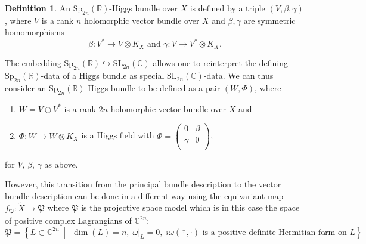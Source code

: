 \documentclass[oneside,11pt]{amsart}
\theoremstyle{definition}
\newtheorem{defn}[thm]{Definition}
\theoremstyle{remark}
\newcommand{\midwd}{\,\middle\vert\,}
\numberwithin{thm}{section}
\numberwithin{equation}{section}
\begin{document}
\begin{defn}\label{defn:classical_Sp2nR}
An $\mathrm{Sp}_{2n}( \mathbb{R})$-Higgs bundle over $X$ is defined by a triple $\left( V,\beta ,\gamma  \right)$, where $V$ is a rank $n$ holomorphic vector bundle over $X$ and $\beta , \gamma$ are symmetric homomorphisms
	\[\beta :{{V}^{*}}\to V\otimes K_X\text{  and  }\gamma :V\to {{V}^{*}}\otimes K_X.\]
\end{defn}

The embedding $\mathrm{Sp}_{2n}( \mathbb{R})\hookrightarrow \mathrm{SL}_{2n}( \mathbb{C})$ allows one to reinterpret the defining $\mathrm{Sp}_{2n}( \mathbb{R})$-data of a Higgs bundle as special $\mathrm{SL}_{2n}( \mathbb{C})$-data. We can thus consider an $\mathrm{Sp}_{2n}( \mathbb{R})$-Higgs bundle to be defined as a pair $\left( W,\Phi  \right)$, where \begin{enumerate}
\item $W=V\oplus {{V}^{*}}$ is a rank $2n$ holomorphic vector bundle over $X$ and
\item $\Phi :W\to W\otimes K_X$ is a Higgs field with $\Phi = \begin{pmatrix}
   0 & \beta   \\
   \gamma  & 0  \\
\end{pmatrix}$, 
\end{enumerate}
for $V$, $\beta$, $\gamma$ as above.

However, this transition from the principal bundle description to the vector bundle description can be done in a different way using the equivariant map $f_\mathfrak P\colon\tilde X\to \mathfrak P$ where $\mathfrak P$ is the projective space model which is in this case the space of positive complex Lagrangians of $\mathbb C^{2n}$:
$$\mathfrak P=\left\{L\subset \mathbb C^{2n}\midwd\; \dim(L)=n,\; \omega|_L=0,\;i\omega(\bar\cdot,\cdot)\text{ is a positive definite Hermitian form on $L$}\right\}.$$
\end{document}
